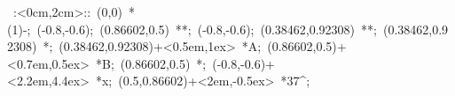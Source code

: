 %


\hbox{
\xy    <2cm,0cm>:<0cm,2cm>::
       (0,0) *\ellipse(1){-}; 
       (-0.8,-0.6); (0.86602,0.5) **\dir{-}; 
       (-0.8,-0.6); (0.38462,0.92308) **\dir{-};
       (0.38462,0.92308) *{\bullet};
       (0.38462,0.92308)+<0.5em,1ex> *{A};
       (0.86602,0.5)+<0.7em,0.5ex> *{B};  
       (0.86602,0.5) *{\bullet};  
       (-0.8,-0.6)+<2.2em,4.4ex> *{x};
       (0.5,0.86602)+<2em,-0.5ex>  *{37^\circ};
\endxy}

